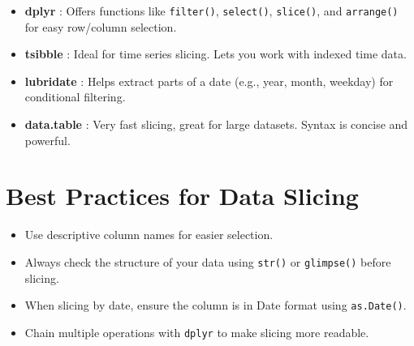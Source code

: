 \begin{itemize}
    \item \textbf{dplyr} : Offers functions like \texttt{filter()}, \texttt{select()}, \texttt{slice()}, and \texttt{arrange()} for easy row/column selection.
    \item \textbf{tsibble} : Ideal for time series slicing. Lets you work with indexed time data.
    \item \textbf{lubridate} : Helps extract parts of a date (e.g., year, month, weekday) for conditional filtering.
    \item \textbf{data.table} : Very fast slicing, great for large datasets. Syntax is concise and powerful.
\end{itemize}

\section*{Best Practices for Data Slicing}

\begin{itemize}
    \item Use descriptive column names for easier selection.
    \item Always check the structure of your data using \texttt{str()} or \texttt{glimpse()} before slicing.
    \item When slicing by date, ensure the column is in Date format using \texttt{as.Date()}.
    \item Chain multiple operations with \texttt{dplyr} to make slicing more readable.
\end{itemize}



